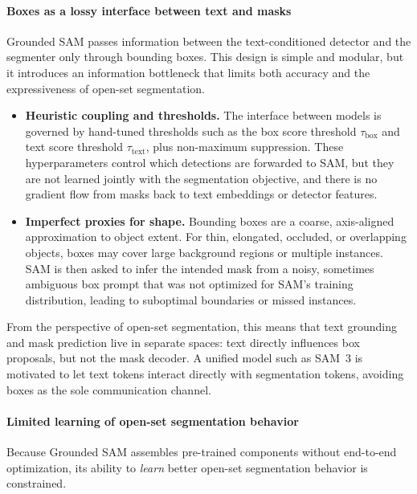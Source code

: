 \begin{enrichment}
\begin{enrichment}
		\paragraph{Boxes as a lossy interface between text and masks}
		Grounded SAM passes information between the text-conditioned detector and the segmenter only through bounding boxes.
		This design is simple and modular, but it introduces an information bottleneck that limits both accuracy and the expressiveness of open-set segmentation.
		
		\begin{itemize}
			\item \textbf{Heuristic coupling and thresholds.}
			The interface between models is governed by hand-tuned thresholds such as the box score threshold $\tau_{\text{box}}$ and text score threshold $\tau_{\text{text}}$, plus non-maximum suppression.
			These hyperparameters control which detections are forwarded to SAM, but they are not learned jointly with the segmentation objective, and there is no gradient flow from masks back to text embeddings or detector features.
			\item \textbf{Imperfect proxies for shape.}
			Bounding boxes are a coarse, axis-aligned approximation to object extent.
			For thin, elongated, occluded, or overlapping objects, boxes may cover large background regions or multiple instances.
			SAM is then asked to infer the intended mask from a noisy, sometimes ambiguous box prompt that was not optimized for SAM’s training distribution, leading to suboptimal boundaries or missed instances.
		\end{itemize}
		
		From the perspective of open-set segmentation, this means that text grounding and mask prediction live in separate spaces: text directly influences box proposals, but not the mask decoder.
		A unified model such as SAM~3 is motivated to let text tokens interact directly with segmentation tokens, avoiding boxes as the sole communication channel.
		
		\paragraph{Limited learning of open-set segmentation behavior}
		Because Grounded SAM assembles pre-trained components without end-to-end optimization, its ability to \emph{learn} better open-set segmentation behavior is constrained.
		

\end{enrichment}
\end{enrichment}
